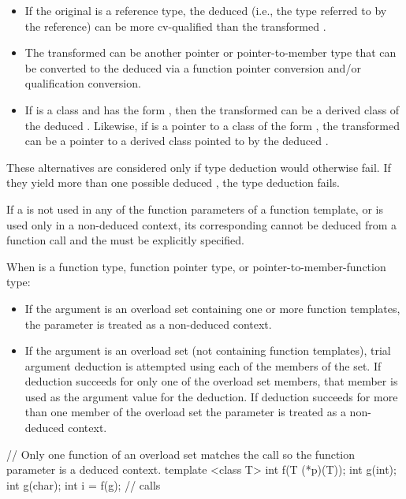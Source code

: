 \begin{itemize}
\item
If the original
is a reference type, the deduced
(i.e.,
the type referred to by the reference) can be more cv-qualified than
the transformed .
\item
The transformed 
can be another pointer or pointer-to-member type that can be converted
to the deduced
via a function pointer conversion and/or
qualification conversion.

\item
If
is a class and
has the form
,
then
the transformed 
can be a derived class of the
deduced
.
Likewise, if
is a pointer to a class of the form
,
the transformed 
can be a pointer to a
derived class pointed to by the deduced
.
\end{itemize}

\pnum
These alternatives are considered only if type deduction would
otherwise fail.
If they yield more than one possible deduced
,
the type deduction fails.
\begin{note}
If a
is not used in any of the function parameters of a function template,
or is used only in a non-deduced context, its corresponding
cannot be deduced from a function call and the
must be explicitly specified.
\end{note}

\pnum
When
is a function type, function pointer type, or pointer-to-member-function type:
\begin{itemize}
\item
If the argument is an overload set containing one or more function templates,
the parameter is treated as a non-deduced context.
\item
If the argument is an overload set (not containing function templates), trial
argument deduction is attempted using each of the members of the set. If
deduction succeeds for only one of the overload set members, that member is
used as the argument value for the deduction. If deduction succeeds for more than
one member of the overload set the parameter is treated as a non-deduced context.
\end{itemize}

\pnum
\begin{example}
\begin{codeblock}
// Only one function of an overload set matches the call so the function parameter is a deduced context.
template <class T> int f(T (*p)(T));
int g(int);
int g(char);
int i = f(g);       // calls 
\end{codeblock}
\end{example}

